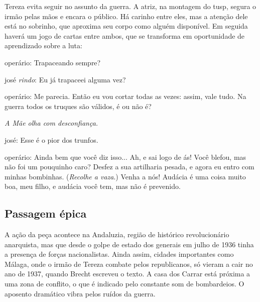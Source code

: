 Tereza evita seguir no assunto da guerra. A atriz, na montagem do {\sc tusp},
segura o irmão pelas mãos e encara o público. Há carinho entre eles, mas
a atenção dele está no sobrinho, que aproxima seu corpo como alguém
disponível. Em seguida haverá um jogo de cartas entre ambos, que se
transforma em oportunidade de aprendizado sobre a luta:

{\sc operário}: Trapaceando sempre?

{\sc josé} {\it rindo}: Eu já trapaceei alguma vez?

{\sc operário}: Me parecia. Então eu vou cortar todas as vezes: assim, vale
tudo. Na guerra todos os truques são válidos, é ou não é?

{\it A Mãe olha com desconfiança.}

{\sc josé}: Esse é o pior dos trunfos.

{\sc operário}: Ainda bem que você diz isso... Ah, e sai logo de ás! Você
blefou, mas não foi um pouquinho caro? Desfez a sua artilharia pesada, e
agora eu entro com minhas bombinhas. ({\it Recolhe a vaza}.) Venha a
nós! Audácia é uma coisa muito boa, meu filho, e audácia você tem, mas
não é prevenido.





\subsection{Passagem épica}

A ação da peça acontece na Andaluzia, região de histórico revolucionário
anarquista, mas que desde o golpe de estado dos generais em julho de
1936 tinha a presença de forças nacionalistas. Ainda assim, cidades
importantes como Málaga, onde o irmão de Tereza combate pelos
republicanos, só vieram a cair no ano de 1937, quando Brecht escreveu o
texto. A casa dos Carrar está próxima a uma zona de conflito, o que é
indicado pelo constante som de bombardeios. O aposento dramático vibra
pelos ruídos da guerra.

